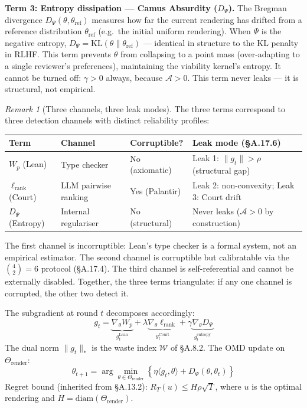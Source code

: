 \documentclass[11pt,a4paper]{article}
\theoremstyle{definition}
\theoremstyle{remark}
\newtheorem{remark}[theorem]{Remark}
\begin{document}
\textbf{Term 3: Entropy dissipation --- Camus Absurdity ($D_\Psi$).}
The Bregman divergence $D_\Psi(\theta, \theta_{\mathrm{ref}})$ measures how far the current rendering has drifted from a reference distribution $\theta_{\mathrm{ref}}$ (e.g.\ the initial uniform rendering). When $\Psi$ is the negative entropy, $D_\Psi = \mathrm{KL}(\theta \| \theta_{\mathrm{ref}})$ --- identical in structure to the KL penalty in RLHF. This term prevents $\theta$ from collapsing to a point mass (over-adapting to a single reviewer's preferences), maintaining the viability kernel's entropy. It cannot be turned off: $\gamma > 0$ always, because $\mathcal{A} > 0$. This term never leaks --- it is structural, not empirical.

\begin{remark}[Three channels, three leak modes]\label{rem:three_channels}
The three terms correspond to three detection channels with distinct reliability profiles:
\begin{center}
\small
\begin{tabularx}{\textwidth}{l l l X}
\toprule
\textbf{Term} & \textbf{Channel} & \textbf{Corruptible?} & \textbf{Leak mode (\S A.17.6)} \\
\midrule
$W_p$ (Lean) & Type checker & No (axiomatic) & Leak 1: $\|g_t\| > \rho$ (structural gap) \\
$\ell_{\mathrm{rank}}$ (Court) & LLM pairwise ranking & Yes (Palantir) & Leak 2: non-convexity; Leak 3: Court drift \\
$D_\Psi$ (Entropy) & Internal regulariser & No (structural) & Never leaks ($\mathcal{A} > 0$ by construction) \\
\bottomrule
\end{tabularx}
\end{center}
The first channel is incorruptible: Lean's type checker is a formal system, not an empirical estimator. The second channel is corruptible but calibratable via the $\binom{4}{2} = 6$ protocol (\S A.17.4). The third channel is self-referential and cannot be externally disabled. Together, the three terms triangulate: if any one channel is corrupted, the other two detect it.
\end{remark}

The subgradient at round $t$ decomposes accordingly:
\[
  g_t = \underbrace{\nabla_\theta W_p}_{g_t^{\mathrm{Lean}}} + \lambda \underbrace{\nabla_\theta \ell_{\mathrm{rank}}}_{g_t^{\mathrm{Court}}} + \gamma \underbrace{\nabla_\theta D_\Psi}_{g_t^{\mathrm{entropy}}}
\]
The dual norm $\|g_t\|_*$ is the waste index $\mathcal{W}$ of \S A.8.2. The OMD update on $\Theta_{\mathrm{render}}$:
\[
  \theta_{t+1} = \arg\min_{\theta \in \Theta_{\mathrm{render}}} \left\{ \eta \langle g_t, \theta \rangle + D_\Psi(\theta, \theta_t) \right\}
\]
Regret bound (inherited from \S A.13.2): $R_T(u) \leq H\rho\sqrt{T}$, where $u$ is the optimal rendering and $H = \mathrm{diam}(\Theta_{\mathrm{render}})$.
\end{document}
